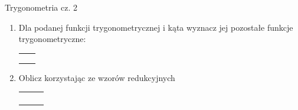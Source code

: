 \documentclass[12pt,a4paper]{article}
\begin{document}
	\begin{center}
		\LARGE Trygonometria cz. 2
	\end{center}
	\vspace{1cm}
	
	
	\begin{enumerate}[1.]	
		\item Dla podanej funkcji trygonometrycznej i kąta wyznacz jej pozostałe funkcje trygonometryczne:
		
		
		\begin{enumerate}[a)] \begin{tabular}{p{7cm} p{7cm}} \item 		
				$\sin\alpha=\frac{5}{13} \qquad \alpha\in(90^\circ,180^\circ)$& \vspace{0.4cm} 	\item $\cos\alpha=0,5\qquad\alpha\in(90^\circ,180^\circ)$ \\
				\item $\cos\alpha=\frac{\sqrt{5}}{5}\qquad\alpha\in(90^\circ,180^\circ)$ &\item $\text{ctg } \alpha=\frac{1}{\sqrt{3}}\qquad\alpha\in(90^\circ,180^\circ)$ \\
				\item $\text{tg }\alpha=2\qquad\alpha\in(90^\circ,180^\circ)$ &\item $\sin\alpha=\frac{1}{\sqrt{3}}\qquad\alpha\in(90^\circ,180^\circ)$ \\
		\end{tabular} \end{enumerate}
		
		\item Oblicz korzystając ze wzorów redukcyjnych
		\begin{enumerate}[a)] \begin{tabular}{p{4cm} p{4cm} p{4cm}}
				\item $\sin 120^\circ=$& \vspace{0.25cm}\item$\cos 120^\circ=$& \vspace{0.25cm} \item$\sin 150^\circ=$\\
				\item$\text{tg } 150^\circ$=&\item$\sin 225^\circ$ =&\item$\cos 420^\circ$=\\
				\item$\cos 330^\circ$=&\item$\sin (-210^\circ)$=&\item$\text{tg }210^\circ$=\\
				\item$\sin1050^\circ$=&\item$\cos(-600^\circ)$=&\item$\text{ctg }(-450^\circ)$=\\
		\end{tabular} \end{enumerate}
	

\end{enumerate}
\end{document}
